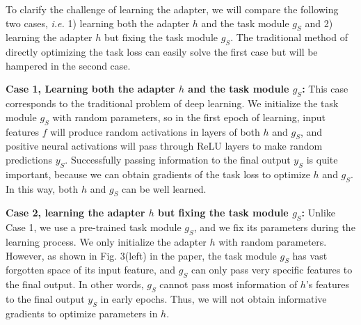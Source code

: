 \documentclass[10pt,twocolumn,letterpaper]{article}
\begin{document}
To clarify the challenge of learning the adapter, we will compare the following two cases, \emph{i.e.} 1) learning both the adapter $h$ and the task module $g_{S}$ and 2) learning the adapter $h$ but fixing the task module $g_{S}$. The traditional method of directly optimizing the task loss can easily solve the first case but will be hampered in the second case.

\textbf{Case 1, Learning both the adapter $h$ and the task module $g_{S}$:} This case corresponds to the traditional problem of deep learning. We initialize the task module $g_{S}$ with random parameters, so in the first epoch of learning, input features $f$ will produce random activations in layers of both $h$ and $g_{S}$, and positive neural activations will pass through ReLU layers to make random predictions $y_{S}$. Successfully passing information to the final output $y_{S}$ is quite important, because we can obtain gradients of the task loss to optimize $h$ and $g_{S}$. In this way, both $h$ and $g_{S}$ can be well learned.

\textbf{Case 2, learning the adapter $h$ but fixing the task module $g_{S}$:} Unlike Case 1, we use a pre-trained task module $g_{S}$, and we fix its parameters during the learning process. We only initialize the adapter $h$ with random parameters. However, as shown in Fig. 3(left) in the paper, the task module $g_{S}$ has vast forgotten space of its input feature, and $g_{S}$ can only pass very specific features to the final output. In other words, $g_{S}$ cannot pass most information of $h$'s features to the final output $y_{S}$ in early epochs. Thus, we will not obtain informative gradients to optimize parameters in $h$.
\end{document}
